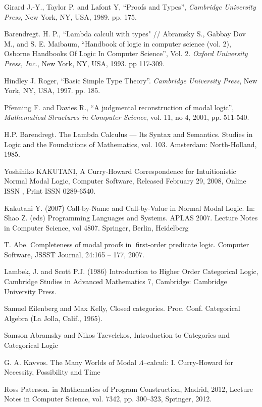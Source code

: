 \documentclass[a4paper]{article}
\begin{document}
\begin{thebibliography}{}
   Girard J.-Y., Taylor P. and  Lafont Y, ``Proofs and Types'', \textit{Cambridge University
  Press}, New York, NY, USA, 1989. pp. 175. \parskip=1mm

   Barendregt. H. P., ``Lambda calculi with types" // Abramsky S., Gabbay Dov M., and S. E.
  Maibaum, ``Handbook of logic in computer science (vol. 2), Osborne Handbooks Of Logic In Computer
  Science'', Vol. 2. \textit{Oxford University Press, Inc.}, New York, NY, USA, 1993. pp 117-309.
  \parskip=1mm

   Hindley J. Roger, ``Basic Simple Type Theory''. \textit{Cambridge University Press}, New
  York, NY, USA, 1997. pp. 185. \parskip=1mm

   Pfenning F. and Davies R., ``A judgmental reconstruction of modal logic'',
  \textit{Mathematical Structures in Computer Science}, vol. 11, no 4, 2001, pp. 511-540. \parskip=1mm

   H.P. Barendregt. The Lambda Calculus --- Its Syntax and Semantics. Studies in Logic and
  the Foundations of Mathematics, vol. 103. Amsterdam: North-Holland, 1985.

   Yoshihiko KAKUTANI, A Curry-Howard Correspondence for Intuitionistic Normal Modal Logic, Computer Software, Released February 29, 2008, Online ISSN , Print ISSN 0289-6540.

   Kakutani Y. (2007) Call-by-Name and Call-by-Value in Normal Modal Logic. In: Shao Z. (eds) Programming Languages and Systems. APLAS 2007. Lecture Notes in Computer Science, vol 4807. Springer, Berlin, Heidelberg

   T. Abe. Completeness of modal proofs in first-order predicate logic. Computer Software, JSSST Journal, 24:165 -- 177, 2007.

   Lambek, J. and Scott P.J. (1986) Introduction to Higher Order Categorical Logic, Cambridge Studies in Advanced Mathematics 7, Cambridge: Cambridge University Press.

   Samuel Eilenberg and Max Kelly, Closed categories. Proc. Conf. Categorical Algebra (La Jolla, Calif., 1965).

   Samson Abramsky and Nikos Tzevelekos, Introduction to Categories and Categorical Logic

   G. A. Kavvos. The Many Worlds of Modal $\Lambda$--calculi: I. Curry-Howard for Necessity, Possibility and Time

   Ross Paterson. in Mathematics of Program Construction, Madrid, 2012, Lecture Notes in Computer Science, vol. 7342, pp. 300--323, Springer, 2012.
\end{thebibliography}
\end{document}
